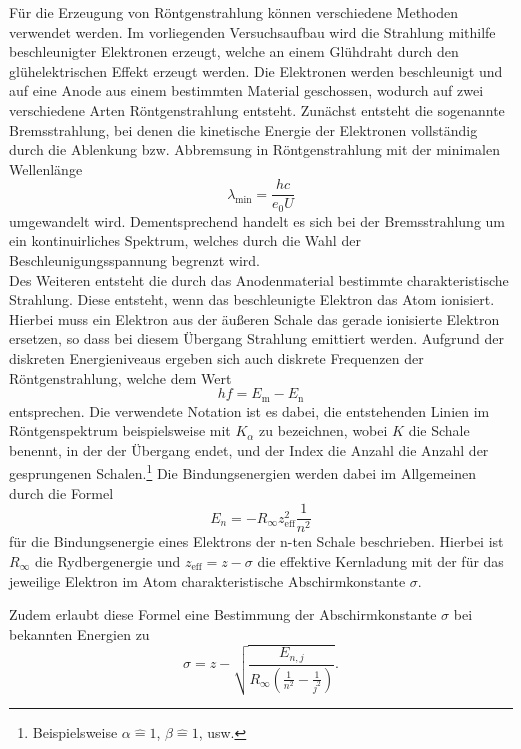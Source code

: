 Für die Erzeugung von Röntgenstrahlung können verschiedene Methoden verwendet werden.
Im vorliegenden Versuchsaufbau wird die Strahlung mithilfe beschleunigter Elektronen erzeugt, welche an einem Glühdraht durch den glühelektrischen Effekt erzeugt werden.
Die Elektronen werden beschleunigt und auf eine Anode aus einem bestimmten Material geschossen, wodurch auf zwei verschiedene Arten Röntgenstrahlung entsteht.
Zunächst entsteht die sogenannte Bremsstrahlung, bei denen die kinetische Energie der Elektronen vollständig durch die Ablenkung bzw. Abbremsung in Röntgenstrahlung mit der minimalen Wellenlänge
\begin{equation}
  \lambda_{\text{min}} = \frac{h c}{e_0 U}
  \label{eqn:l}
\end{equation}
umgewandelt wird.
Dementsprechend handelt es sich bei der Bremsstrahlung um ein kontinuirliches Spektrum, welches durch die Wahl der Beschleunigungsspannung begrenzt wird.\\
Des Weiteren entsteht die durch das Anodenmaterial bestimmte charakteristische Strahlung.
Diese entsteht, wenn das beschleunigte Elektron das Atom ionisiert.
Hierbei muss ein Elektron aus der äußeren Schale das gerade ionisierte Elektron ersetzen, so dass bei diesem Übergang Strahlung emittiert werden.
Aufgrund der diskreten Energieniveaus ergeben sich auch diskrete Frequenzen der Röntgenstrahlung, welche dem Wert
\begin{equation}
  h f = E_{\text{m}} - E_{\text{n}}
\end{equation}
entsprechen.
Die verwendete Notation ist es dabei, die entstehenden Linien im Röntgenspektrum beispielsweise mit $K_{\alpha}$ zu bezeichnen, wobei $K$ die Schale benennt, in der der Übergang endet, und der Index die Anzahl die Anzahl der gesprungenen Schalen.\footnote{Beispielsweise $\alpha \hat{=} 1$, $\beta \hat{=} 1$, usw.}
Die Bindungsenergien werden dabei im Allgemeinen durch die Formel
\begin{equation}
  E_n = - R_{\infty} z_{\text{eff}}^2 \frac{1}{n^2}
\end{equation}
für die Bindungsenergie eines Elektrons der n-ten Schale beschrieben.
Hierbei ist $R_{\infty}$ die Rydbergenergie und $z_{\text{eff}} = z - \sigma$ die effektive Kernladung mit der für das jeweilige Elektron im Atom charakteristische Abschirmkonstante $\sigma$.

Zudem erlaubt diese Formel eine Bestimmung der Abschirmkonstante $\sigma$ bei bekannten Energien zu
\begin{equation}
  \sigma = z - \sqrt{ \frac{E_{n,j}}{R_{\infty} ( \frac{1}{n^2}- \frac{1}{j^2} ) } }.
  \label{eqn:sigma}
\end{equation}

